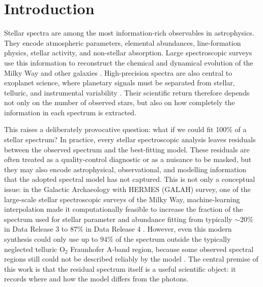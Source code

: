 \documentclass[twocolumn,apj,numberedappendix,appendixfloats]{openjournal}
\begin{document}
\section{Introduction}
\label{sec:introduction}

Stellar spectra are among the most information-rich observables in astrophysics. They encode atmospheric parameters, elemental abundances, line-formation physics, stellar activity, and non-stellar absorption. Large spectroscopic surveys use this information to reconstruct the chemical and dynamical evolution of the Milky Way \citep{FreemanBlandHawthorn2002, BlandHawthorn_Gerhard2016} and other galaxies \citep{VandeVen2025}. High-precision spectra are also central to exoplanet science, where planetary signals must be separated from stellar, telluric, and instrumental variability \citep[e.g.][]{Fischer2016}. Their scientific return therefore depends not only on the number of observed stars, but also on how completely the information in each spectrum is extracted.

This raises a deliberately provocative question: what if we could fit 100\% of a stellar spectrum? In practice, every stellar spectroscopic analysis leaves residuals between the observed spectrum and the best-fitting model. These residuals are often treated as a quality-control diagnostic or as a nuisance to be masked, but they may also encode astrophysical, observational, and modelling information that the adopted spectral model has not captured. This is not only a conceptual issue: in the Galactic Archaeology with HERMES (GALAH) survey, one of the large-scale stellar spectroscopic surveys of the Milky Way, machine-learning interpolation made it computationally feasible to increase the fraction of the spectrum used for stellar parameter and abundance fitting from typically $\sim20\%$ in Data Release 3 \citep[DR3,][]{Buder2021} to $87\%$ in Data Release 4 \citep[DR4,][]{Buder2025b}. However, even this modern synthesis could only use up to $94\%$ of the spectrum outside the typically neglected telluric O$_2$ Fraunhofer A-band region, because some observed spectral regions still could not be described reliably by the model \citep[][Sec.~4.3.2]{Buder2025b}. The central premise of this work is that the residual spectrum itself is a useful scientific object: it records where and how the model differs from the photons.
\end{document}
